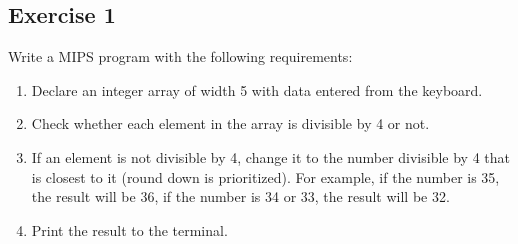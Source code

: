 \subsection{Exercise 1}
Write a MIPS program with the following requirements:
\begin{enumerate}
  \item Declare an integer array of width 5 with data entered from the keyboard.
  \item Check whether each element in the array is divisible by 4 or not.
  \item If an element is not divisible by 4, change it to the number divisible by
        4 that is closest to it (round down is prioritized). For example, if the
        number is 35, the result will be 36, if the number is 34 or 33, the result
        will be 32.
  \item Print the result to the terminal.
\end{enumerate}

